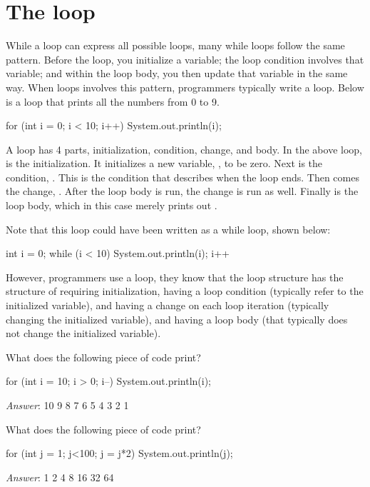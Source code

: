 \section{The  loop}
While a  loop can express all possible loops, many while loops follow
the same pattern. Before the loop, you initialize a variable; the loop condition
involves that variable; and within the loop body, you then update that variable
in the same way. When loops involves this pattern, programmers typically write a
 loop. Below is a  loop that prints all the numbers from 0 to 9.

\begin{code}
for (int i = 0; i < 10; i++)
{
    System.out.println(i);
}
\end{code}

A  loop has 4 parts, initialization, condition, change, and body. In the
above  loop,  is the initialization. It initializes a new
variable, , to be zero. Next is the condition, . This is the
condition that describes when the loop ends. Then comes the change, .
After the loop body is run, the change is run as well.  Finally is the loop
body, which in this case merely prints out .

Note that this loop could have been written as a while loop, shown below:
\begin{code}
int i = 0;
while (i < 10)  
{
    System.out.println(i);
    i++
}
\end{code}
%
However, programmers use a  loop, they know that the loop structure has
the structure of requiring initialization, having a loop condition (typically
refer to the initialized variable), and having a change on each loop
iteration (typically changing the initialized variable), and having a loop body
(that typically does not change the initialized variable).

\begin{example}
What does the following piece of code print?

\begin{code}
for (int i = 10; i > 0; i--)
{
    System.out.println(i);
}
\end{code}

\emph{Answer}: 
10
9
8
7
6
5
4
3
2
1
\end{example}

\begin{example}
What does the following piece of code print?

\begin{code}
for (int j = 1; j<100; j = j*2)
{
    System.out.println(j);
}
\end{code}

\emph{Answer}: 
1
2
4
8
16
32
64
\end{example}

